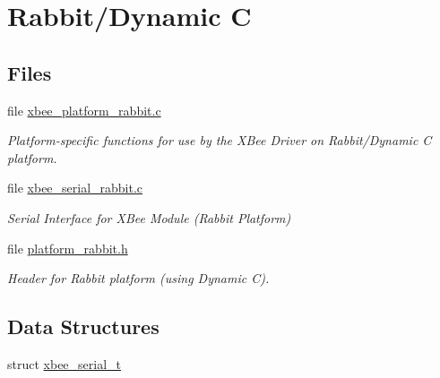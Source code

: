 \hypertarget{group__hal__rabbit}{}\section{Rabbit/\+Dynamic C}
\label{group__hal__rabbit}
\subsection*{Files}
\begin{DoxyCompactItemize}
\item 
file \hyperlink{xbee__platform__rabbit_8c}{xbee\+\_\+platform\+\_\+rabbit.\+c}
\begin{DoxyCompactList}\small\item\em Platform-\/specific functions for use by the X\+Bee Driver on Rabbit/\+Dynamic C platform. \end{DoxyCompactList}\item 
file \hyperlink{xbee__serial__rabbit_8c}{xbee\+\_\+serial\+\_\+rabbit.\+c}
\begin{DoxyCompactList}\small\item\em Serial Interface for X\+Bee Module (Rabbit Platform) \end{DoxyCompactList}\item 
file \hyperlink{platform__rabbit_8h}{platform\+\_\+rabbit.\+h}
\begin{DoxyCompactList}\small\item\em Header for Rabbit platform (using Dynamic C). \end{DoxyCompactList}\end{DoxyCompactItemize}
\subsection*{Data Structures}
\begin{DoxyCompactItemize}
\item 
struct \hyperlink{structxbee__serial__t}{xbee\+\_\+serial\+\_\+t}
\end{DoxyCompactItemize}
